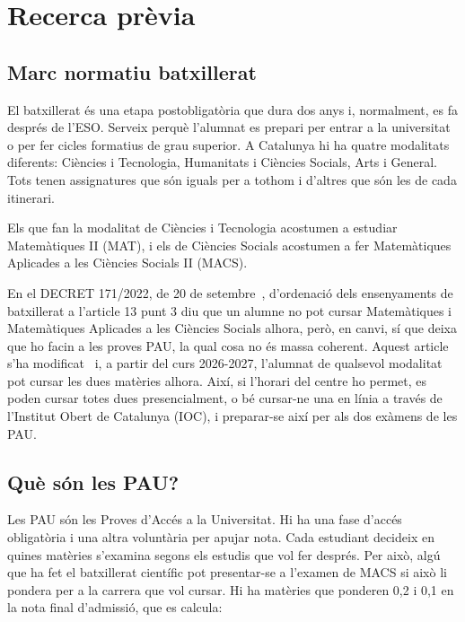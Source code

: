 \chapter{Recerca prèvia}
\label{recerca previa}
\section{Marc normatiu batxillerat}
El batxillerat és una etapa postobligatòria que dura dos anys i, normalment, es fa després de l'ESO. Serveix perquè l'alumnat es prepari per entrar a la universitat o per fer cicles formatius de grau superior. A Catalunya hi ha quatre modalitats diferents: Ciències i Tecnologia, Humanitats i Ciències Socials, Arts i General. Tots tenen assignatures que són iguals per a tothom i d'altres que són les de cada itinerari.


Els que fan la modalitat de Ciències i Tecnologia acostumen a estudiar Matemàtiques II (MAT), i els de Ciències Socials acostumen a fer Matemàtiques Aplicades a les Ciències Socials II (MACS).

En el DECRET 171/2022, de 20 de setembre~\cite{curriculum-batxillerat-2022}, d'ordenació dels ensenyaments de batxillerat a l'article 13 punt 3 diu que un alumne no pot cursar Matemàtiques i Matemàtiques Aplicades a les Ciències Socials alhora, però, en canvi, sí que deixa que ho facin a les proves PAU, la qual cosa no és massa coherent. Aquest article s'ha modificat~\cite{curriculum-batxillerat-2026} i, a partir del curs 2026-2027, l'alumnat de qualsevol modalitat pot cursar les dues matèries alhora. Així, si l'horari del centre ho permet, es poden cursar totes dues presencialment, o bé cursar-ne una en línia a través de l'Institut Obert de Catalunya (IOC), i preparar-se així per als dos exàmens de les PAU.

\vspace*{1truecm}

\section{Què són les PAU?}
Les PAU són les Proves d'Accés a la Universitat. Hi ha una fase d'accés obligatòria i una altra voluntària per apujar nota. Cada estudiant decideix en quines matèries s'examina segons els estudis que vol fer després. Per això, algú que ha fet el batxillerat científic pot presentar-se a l'examen de MACS si això li pondera per a la carrera que vol cursar. Hi ha matèries que ponderen 0,2 i 0,1 en la nota final d'admissió, que es calcula:

